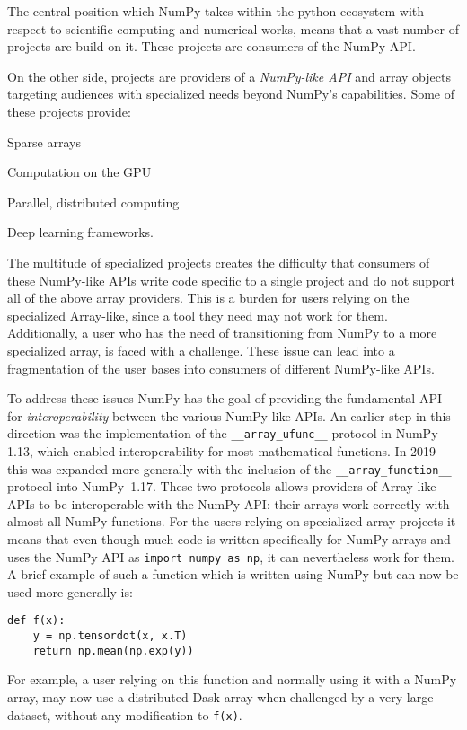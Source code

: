 \documentclass[fleqn,10pt]{wlscirep}
\newcommand{\code}[1]{\texttt{#1}}
\newcommand{\tightlist}{\setlength{\itemsep}{0pt}\setlength{\parskip}{0pt}}
\begin{document}
The central position which NumPy takes within the python ecosystem with
respect to scientific computing and numerical works,
means that a vast number of projects are build on it.
These projects are consumers of the NumPy API.

On the other side, projects are providers of a
\emph{NumPy-like API} and array objects targeting audiences with specialized needs beyond
NumPy's capabilities. Some of these projects provide:

\begin{description}
    \tightlist
    \item[SciPy's \code{scipy.sparse} and \code{pydata.sparse}:] Sparse arrays
    \item[CuPy:] Computation on the GPU
    \item[Dask:] Parallel, distributed computing
    \item[PyTorch and TensorFlow:] Deep learning frameworks.
\end{description}

The multitude of specialized projects creates the difficulty that consumers
of these NumPy-like APIs write code specific to a single project and do not support
all of the above array providers.
This is a burden for users relying on the specialized Array-like, since
a tool they need may not work for them.
Additionally, a user who has the need of transitioning from NumPy to a more
specialized array, is faced with a challenge.
These issue can lead into a fragmentation of the user bases into consumers
of different NumPy-like APIs.

To address these issues NumPy has the goal of providing the fundamental
API for \emph{interoperability} between the various NumPy-like APIs.
An earlier step in this direction was the implementation of the
\code{\_\_array\_ufunc\_\_} protocol in NumPy 1.13, which enabled interoperability
for most mathematical functions.\cite{NEP13}
In 2019 this was expanded more generally with the inclusion of the
\code{\_\_array\_function\_\_} protocol into NumPy~1.17.
These two protocols allows providers of Array-like APIs to be interoperable
with the NumPy API: their arrays work correctly with almost all NumPy functions.\cite{NEP18}
For the users relying on specialized array projects it means that even though
much code is written specifically for NumPy arrays and uses the NumPy API as
\code{import numpy as np}, it can nevertheless work for them.
A brief example of such a function which is written using NumPy
but can now be used more generally is:
\begin{lstlisting}
def f(x):
    y = np.tensordot(x, x.T)
    return np.mean(np.exp(y))
\end{lstlisting}
For example, a user relying on this function and normally using it with a
NumPy array, may now use a distributed Dask array when challenged
by a very large dataset, without any modification to \code{f(x)}.
\end{document}
